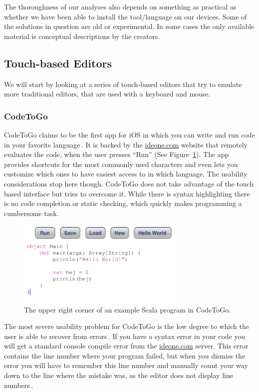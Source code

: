 The thoroughness of our analyses also depends on something as practical as whether we have been able to install the tool/language on our devices.
Some of the solutions in question are old or experimental.
In some cases the only available material is conceptual descriptions by the creators.

\subsection{Touch-based Editors}
\label{subsec:TouchBasedEditors}
We will start by looking at a series of touch-based editors that try to emulate more traditional editors, that are used with a keyboard and mouse. 

\subsubsection{CodeToGo}
\label{subsub:CodeToGo}
CodeToGo claims to be the first app for iOS in which you can write and run code in your favorite language\,\cite{codetogo}. It is backed by the \url{ideone.com} website\cite{ideone} that remotely evaluates the code, when the user presses ``Run'' (See Figure~\ref{fig:CodeToGo_screenshot}). The app provides shortcuts for the most commonly used characters and even lets you customize which ones to have easiest access to in which language. The usability considerations stop here though. CodeToGo does not take advantage of the touch based interface but tries to overcome it. While there is syntax highlighting there is no code completion or static checking, which quickly makes programming a cumbersome task.

\begin{figure}
	\centering
		\includegraphics[width=80mm]{diagrams/CodeToGo_screenshot.PNG}
	\caption{The upper right corner of an example Scala program in CodeToGo.}
\label{fig:CodeToGo_screenshot}
\end{figure}

The most severe usability problem for CodeToGo is the low degree to which the user is able to recover from errors\,\cite{nielsen1990heuristic}. 
If you have a syntax error in your code you will get a standard console compile error from the \url{ideone.com} server. 
This error contains the line number where your program failed, but when you dismiss the error you will have to remember this line number and manually count your way down to the line where the mistake was, as the editor does not display line numbers\,\cite{nielsen1990heuristic}.

